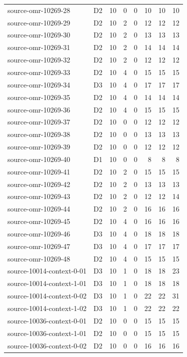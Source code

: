 \begin{longtable}{p{}lrrrrrr}
source-omr-10269-28 & D2 & 10 & 0 & 0 & 10 & 10 & 10\\
source-omr-10269-29 & D2 & 10 & 2 & 0 & 12 & 12 & 12\\
source-omr-10269-30 & D2 & 10 & 2 & 0 & 13 & 13 & 13\\
source-omr-10269-31 & D2 & 10 & 2 & 0 & 14 & 14 & 14\\
source-omr-10269-32 & D2 & 10 & 2 & 0 & 12 & 12 & 12\\
source-omr-10269-33 & D2 & 10 & 4 & 0 & 15 & 15 & 15\\
source-omr-10269-34 & D3 & 10 & 4 & 0 & 17 & 17 & 17\\
source-omr-10269-35 & D2 & 10 & 4 & 0 & 14 & 14 & 14\\
source-omr-10269-36 & D2 & 10 & 4 & 0 & 15 & 15 & 15\\
source-omr-10269-37 & D2 & 10 & 0 & 0 & 12 & 12 & 12\\
source-omr-10269-38 & D2 & 10 & 0 & 0 & 13 & 13 & 13\\
source-omr-10269-39 & D2 & 10 & 0 & 0 & 12 & 12 & 12\\
source-omr-10269-40 & D1 & 10 & 0 & 0 & 8 & 8 & 8\\
source-omr-10269-41 & D2 & 10 & 2 & 0 & 15 & 15 & 15\\
source-omr-10269-42 & D2 & 10 & 2 & 0 & 13 & 13 & 13\\
source-omr-10269-43 & D2 & 10 & 2 & 0 & 12 & 12 & 14\\
source-omr-10269-44 & D2 & 10 & 2 & 0 & 16 & 16 & 16\\
source-omr-10269-45 & D2 & 10 & 4 & 0 & 16 & 16 & 16\\
source-omr-10269-46 & D3 & 10 & 4 & 0 & 18 & 18 & 18\\
source-omr-10269-47 & D3 & 10 & 4 & 0 & 17 & 17 & 17\\
source-omr-10269-48 & D2 & 10 & 4 & 0 & 15 & 15 & 15\\
source-10014-context-0-01 & D3 & 10 & 1 & 0 & 18 & 18 & 23\\
source-10014-context-1-01 & D3 & 10 & 1 & 0 & 18 & 18 & 18\\
source-10014-context-0-02 & D3 & 10 & 1 & 0 & 22 & 22 & 31\\
source-10014-context-1-02 & D3 & 10 & 1 & 0 & 22 & 22 & 22\\
source-10036-context-0-01 & D2 & 10 & 0 & 0 & 15 & 15 & 15\\
source-10036-context-1-01 & D2 & 10 & 0 & 0 & 15 & 15 & 15\\
source-10036-context-0-02 & D2 & 10 & 0 & 0 & 16 & 16 & 16\\

\end{longtable}
